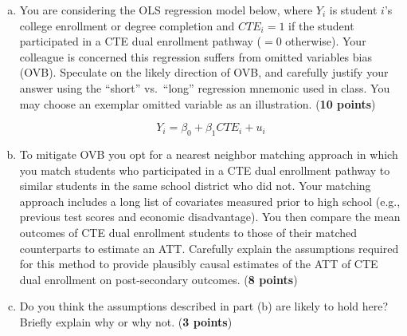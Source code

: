 \documentclass[12pt]{article}
\begin{document}
\begin{enumerate}[(a)]
\setlength\itemsep{1.5em}

\item You are considering the OLS regression model below, where $Y_i$ is student $i$'s college enrollment or degree completion and $CTE_i=1$ if the student participated in a CTE dual enrollment pathway ($=0$ otherwise). Your colleague is concerned this regression suffers from omitted variables bias (OVB). Speculate on the likely direction of OVB, and carefully justify your answer using the ``short'' vs.\ ``long'' regression mnemonic used in class. You may choose an exemplar omitted variable as an illustration.  ({\bf 10 points})

$$ Y_i = \beta_0 + \beta_1 CTE_i + u_i $$


\item To mitigate OVB you opt for a nearest neighbor matching approach in which you match students who participated in a CTE dual enrollment pathway to similar students in the same school district who did not. Your matching approach includes a long list of covariates measured prior to high school (e.g., previous test scores and economic disadvantage). You then compare the mean outcomes of CTE dual enrollment students to those of their matched counterparts to estimate an ATT. Carefully explain the assumptions required for this method to provide plausibly causal estimates of the ATT of CTE dual enrollment on post-secondary outcomes. ({\bf 8 points}) 

\item Do you think the assumptions described in part (b) are likely to hold here? Briefly explain why or why not. ({\bf 3 points})


\end{enumerate}
\end{document}
